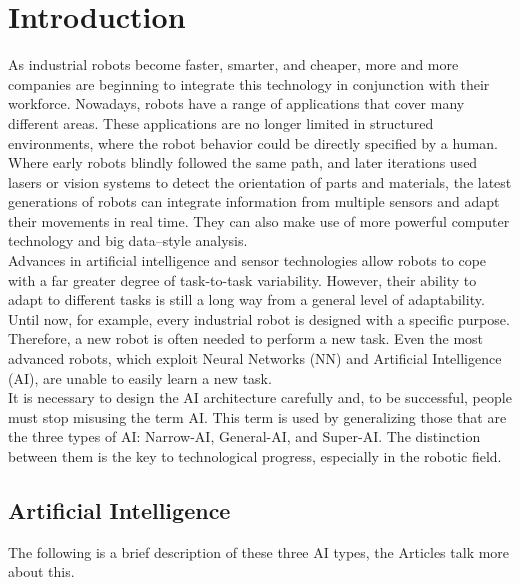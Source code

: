 
\chapter{Introduction} \label{cha:introduction}

As industrial robots become faster, smarter, and cheaper, more and more companies are beginning to integrate this technology in conjunction with their workforce. 
Nowadays, robots have a range of applications that cover many different areas. These applications are no longer limited in structured environments, where the robot behavior could be directly specified by a human. \\
Where early robots blindly followed the same path, and later iterations used lasers or vision systems to detect the orientation of parts and materials, the latest generations of robots can integrate information from multiple sensors and adapt their movements in real time. They can also make use of more powerful computer technology and big data–style analysis. \\
Advances in artificial intelligence and sensor technologies allow robots to cope with a far greater degree of task-to-task variability. However, their ability to adapt to different tasks is still a long way from a general level of adaptability. \\
Until now, for example, every industrial robot is designed with a specific purpose. Therefore, a new robot is often needed to perform a new task. Even the most advanced robots, which exploit Neural Networks (NN) and Artificial Intelligence (AI), are unable to easily learn a new task. \\
It is necessary to design the AI architecture carefully and, to be successful, people must stop misusing the term AI. This term is used by generalizing those that are the three types of AI: Narrow-AI, General-AI, and Super-AI. The distinction between them is the key to technological progress, especially in the robotic field. 


\section{Artificial Intelligence}\label{sec:problem_description}

The following is a brief description of these three AI types, the Articles \cite{davidson_2019, edi_weekly, lawtomated_2020, allan_2018, astute_solutions_2020, bhatia_2021} talk more about this. 

